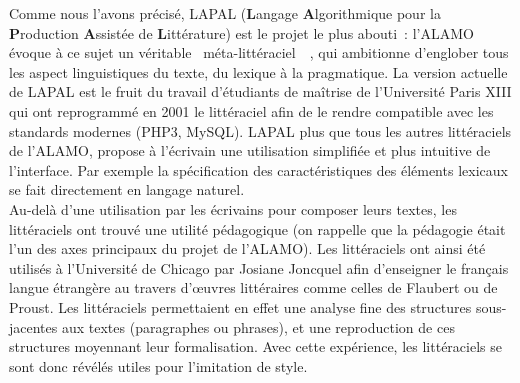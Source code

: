 \documentclass{article}
\begin{document}
					Comme nous l'avons précisé, LAPAL (\textbf{L}angage \textbf{A}lgorithmique pour la \textbf{P}roduction \textbf{A}ssistée de \textbf{L}ittérature) est le projet le plus abouti~: l'ALAMO évoque à ce sujet un véritable \guillemotleft~méta-littéraciel~\guillemotright~\autocite{alamo}, qui ambitionne d'englober tous les aspect linguistiques du texte, du lexique à la pragmatique. La version actuelle de LAPAL est le fruit du travail d'étudiants de maîtrise de l'Université Paris XIII qui ont reprogrammé en 2001 le littéraciel afin de le rendre compatible avec les standards modernes (PHP3, MySQL). LAPAL plus que tous les autres littéraciels de l'ALAMO, propose à l'écrivain une utilisation simplifiée et plus intuitive de l'interface. Par exemple la spécification des caractéristiques des éléments lexicaux se fait directement en langage naturel.\\
					
					Au-delà d'une utilisation par les écrivains pour composer leurs textes, les littéraciels ont trouvé une utilité pédagogique (on rappelle que la pédagogie était l'un des axes principaux du projet de l'ALAMO). Les littéraciels ont ainsi été utilisés à l'Université de Chicago par Josiane Joncquel afin d'enseigner le français langue étrangère au travers d'œuvres littéraires comme celles de Flaubert ou de Proust. Les littéraciels permettaient en effet une analyse fine des structures sous-jacentes aux textes (paragraphes ou phrases), et une reproduction de ces structures moyennant leur formalisation. Avec cette expérience, les littéraciels se sont donc révélés utiles pour l'imitation de style.
					
\end{document}
